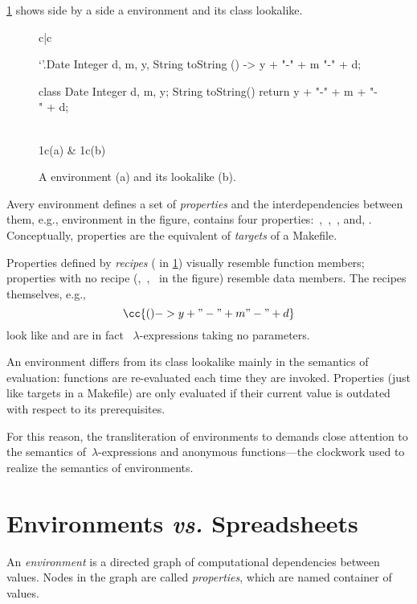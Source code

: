 \cref{figure:date} shows side by a side a \Reap environment and its \Java
class lookalike.

\begin{figure}
  \caption{\label{figure:date}%
    A \Reap environment (a) and its \Java lookalike (b).
  }
  \begin{tabular}{c|c}
    \begin{reap}
    `'.Date {
    Integer d, m, y,
    String toString () ->
    y + "-" + m "-" + d;
    }
    \end{reap}

    \begin{java}
    class Date {
    Integer d, m, y;
    String toString() {
    return
    y + "-" + m + "-" + d;
    }
    }
    \end{java}
      \\ \multicolumn1c{(a)} & \multicolumn1c{(b)}
  \end{tabular}
\end{figure}

Avery environment defines a set of \emph{properties} and the interdependencies
between them, e.g., environment  in the figure, contains four
properties:~,~,~, and, . Conceptually,
properties are the equivalent of \emph{targets} of a Makefile.

Properties defined by \emph{recipes} ( in \cref{figure:date})
visually resemble function members; properties with no recipe
(,~,~ in the figure) resemble data members.
The recipes themselves, e.g., \[
\cc{ () -> y + "-" + m "-" + d}
\] look like and are in fact \Java~$λ$-expressions taking no parameters.

An environment differs from its class lookalike mainly in the semantics of
evaluation: functions are re-evaluated each time they are invoked. Properties
(just like targets in a Makefile) are only evaluated if their current value
is outdated with respect to its prerequisites.

For this reason, the transliteration of environments to \Java demands close
attention to the semantics of~$λ$-expressions and anonymous functions---the
\Java clockwork used to realize the semantics of environments.

\section{Environments \emph{vs.} Spreadsheets}

An \emph{environment} is a directed graph of computational dependencies between
values. Nodes in the graph are called \emph{properties}, which are named
container of values.

